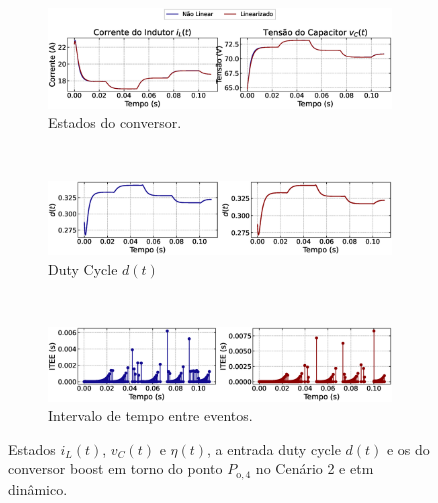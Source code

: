 \begin{figure}[H]
  \centering
  \captionsetup{justification=centering}
  \begin{subfigure}{1.\textwidth}
    \centering
    \includegraphics[width=1.\textwidth]{figuras/dynamic-etm/boost/sim2/op2/result.eps}
    \caption{Estados do conversor.}
    \label{fig:boost_converter_variable_pcpl_dynamic_etm_op2_a}
  \end{subfigure}
  \\[6pt]
  \begin{subfigure}{1.\textwidth}
    \centering
    \includegraphics[width=1.\textwidth]{figuras/dynamic-etm/boost/sim2/op2/duty-cycle.eps}
    \caption{Duty Cycle $d(t)$}
    \label{fig:boost_converter_variable_pcpl_dynamic_etm_op2_b}
  \end{subfigure}
  \\[6pt]
  \begin{subfigure}{1.\textwidth}
    \centering
    \includegraphics[width=1.\textwidth]{figuras/dynamic-etm/boost/sim2/op2/inter-event-times.eps}
    \caption{Intervalo de tempo entre eventos.}
    \label{fig:boost_converter_variable_pcpl_dynamic_etm_op2_c}
  \end{subfigure}
  \caption{Estados $i_L(t)$, $v_C(t)$ e $\eta(t)$, a entrada duty cycle $d(t)$ e os  do conversor boost em torno do ponto $P_{\mathrm{o}, 4}$ no Cenário 2 e \acrshort{etm} dinâmico.}
  \label{fig:boost_converter_variable_pcpl_dynamic_etm_op2}
\end{figure}

